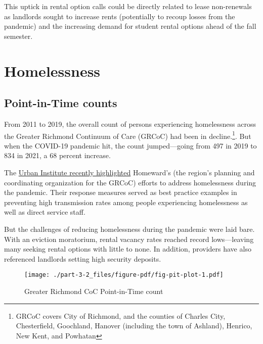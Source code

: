 \documentclass[
  letterpaper,
  DIV=11,
  numbers=noendperiod]{scrreprt}
\begin{document}
This uptick in rental option calls could be directly related to lease
non-renewals as landlords sought to increase rents (potentially to
recoup losses from the pandemic) and the increasing demand for student
rental options ahead of the fall semester.

\hypertarget{homelessness}{%
\section{Homelessness}\label{homelessness}}

\hypertarget{point-in-time-counts}{%
\subsection{Point-in-Time counts}\label{point-in-time-counts}}

From 2011 to 2019, the overall count of persons experiencing
homelessness across the Greater Richmond Continuum of Care (GRCoC) had
been in decline.\footnote{GRCoC covers City of Richmond, and the
  counties of Charles City, Chesterfield, Goochland, Hanover (including
  the town of Ashland), Henrico, New Kent, and Powhatan}. But when the
COVID-19 pandemic hit, the count jumped---going from 497 in 2019 to 834
in 2021, a 68 percent increase.

The
\href{https://www.urban.org/sites/default/files/publication/104529/richmond-virginia-response-to-homelessness-during-the-covid-19-pandemic_0.pdf}{Urban
Institute recently highlighted} Homeward's (the region's planning and
coordinating organization for the GRCoC) efforts to address homelessness
during the pandemic. Their response measures served as best practice
examples in preventing high transmission rates among people experiencing
homelessness as well as direct service staff.

But the challenges of reducing homelessness during the pandemic were
laid bare. With an eviction moratorium, rental vacancy rates reached
record lows---leaving many seeking rental options with little to none.
In addition, providers have also referenced landlords setting high
security deposits.

\begin{figure}

{\centering \texttt{[image: ./part-3-2\_files/figure-pdf/fig-pit-plot-1.pdf]}

}

\caption{\label{fig-pit-plot}Greater Richmond CoC Point-in-Time count}

\end{figure}
\end{document}

